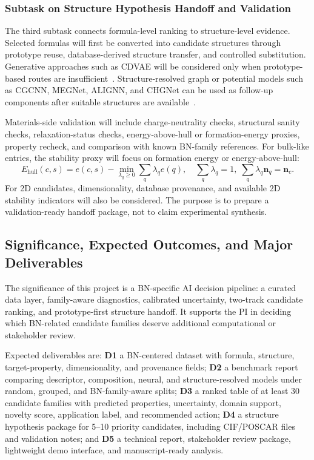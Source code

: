 \documentclass[12pt,a4paper]{article}
\newcommand{\ehull}{E_{\mathrm{hull}}}
\begin{document}
\subsubsection{Subtask on Structure Hypothesis Handoff and Validation}
The third subtask connects formula-level ranking to structure-level evidence. Selected formulas will first be converted into candidate structures through prototype reuse, database-derived structure transfer, and controlled substitution. Generative approaches such as CDVAE will be considered only when prototype-based routes are insufficient~\cite{xie2022_cdvae}. Structure-resolved graph or potential models such as CGCNN, MEGNet, ALIGNN, and CHGNet can be used as follow-up components after suitable structures are available~\cite{xie2018_cgcnn,chen2019_megnet,choudhary2021_alignn,deng2023_chgnet}.

Materials-side validation will include charge-neutrality checks, structural sanity checks, relaxation-status checks, energy-above-hull or formation-energy proxies, property recheck, and comparison with known BN-family references. For bulk-like entries, the stability proxy will focus on formation energy or energy-above-hull:
\[
  \ehull(c,s)=e(c,s)-
  \min_{\lambda_q\ge0}\sum_q\lambda_q e(q),
  \quad \sum_q\lambda_q=1,\;\sum_q\lambda_q\mathbf{n}_q=\mathbf{n}_c.
\]
For 2D candidates, dimensionality, database provenance, and available 2D stability indicators will also be considered. The purpose is to prepare a validation-ready handoff package, not to claim experimental synthesis.

\subsection{Significance, Expected Outcomes, and Major Deliverables}
The significance of this project is a BN-specific AI decision pipeline: a curated data layer, family-aware diagnostics, calibrated uncertainty, two-track candidate ranking, and prototype-first structure handoff. It supports the PI in deciding which BN-related candidate families deserve additional computational or stakeholder review.

Expected deliverables are: \textbf{D1} a BN-centered dataset with formula, structure, target-property, dimensionality, and provenance fields; \textbf{D2} a benchmark report comparing descriptor, composition, neural, and structure-resolved models under random, grouped, and BN-family-aware splits; \textbf{D3} a ranked table of at least 30 candidate families with predicted properties, uncertainty, domain support, novelty score, application label, and recommended action; \textbf{D4} a structure hypothesis package for 5--10 priority candidates, including CIF/POSCAR files and validation notes; and \textbf{D5} a technical report, stakeholder review package, lightweight demo interface, and manuscript-ready analysis.
\end{document}
